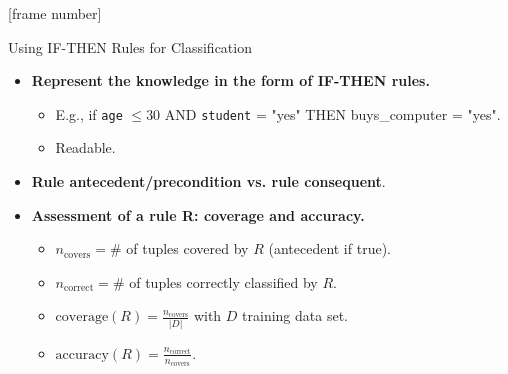 \documentclass[aspectratio=169,t,table]{beamer}
\begin{document}
  {
    [frame number]
    \begin{frame}{Using \uppercase{if-then} Rules for Classification}
      \begin{itemize}
        \item \textbf{Represent the knowledge in the form of {\color{airforceblue}IF-THEN rules}.}
        \begin{itemize}
          \item E.g., if \texttt{age} $\leq 30$ AND \texttt{student} = "yes" THEN buys\_computer = "yes".
          \item Readable.
        \end{itemize}
        \item \textbf{Rule {\color{airforceblue}antecedent/precondition} vs. rule {\color{airforceblue}consequent}}.
        \item \textbf{Assessment of a rule R: coverage and accuracy.}
        \begin{itemize}
          \item $n_{\text{covers}} = \#$ of tuples covered by $R$ (antecedent if true).
          \item $n_{\text{correct}} = \#$ of tuples correctly classified by $R$.
          \item $\text{coverage}(R) = \frac{n_{\text{covers}}}{|D|}$ with $D$ training data set.
          \item $\text{accuracy}(R) = \frac{n_{\text{correct}}}{n_{\text{covers}}}$.
        \end{itemize}
      \end{itemize}
    \end{frame}
  }
\end{document}
